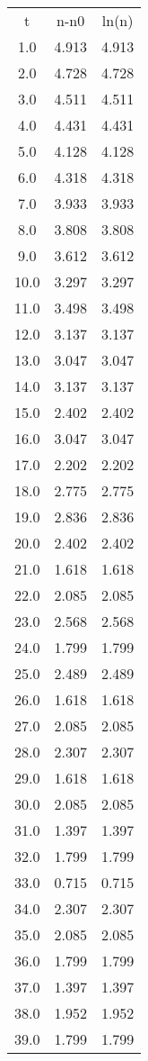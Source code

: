 \begin{table}
\begin{tabular}{ccc}
t & n-n0 & ln(n) \\
1.0 & 4.913 & 4.913 \\
2.0 & 4.728 & 4.728 \\
3.0 & 4.511 & 4.511 \\
4.0 & 4.431 & 4.431 \\
5.0 & 4.128 & 4.128 \\
6.0 & 4.318 & 4.318 \\
7.0 & 3.933 & 3.933 \\
8.0 & 3.808 & 3.808 \\
9.0 & 3.612 & 3.612 \\
10.0 & 3.297 & 3.297 \\
11.0 & 3.498 & 3.498 \\
12.0 & 3.137 & 3.137 \\
13.0 & 3.047 & 3.047 \\
14.0 & 3.137 & 3.137 \\
15.0 & 2.402 & 2.402 \\
16.0 & 3.047 & 3.047 \\
17.0 & 2.202 & 2.202 \\
18.0 & 2.775 & 2.775 \\
19.0 & 2.836 & 2.836 \\
20.0 & 2.402 & 2.402 \\
21.0 & 1.618 & 1.618 \\
22.0 & 2.085 & 2.085 \\
23.0 & 2.568 & 2.568 \\
24.0 & 1.799 & 1.799 \\
25.0 & 2.489 & 2.489 \\
26.0 & 1.618 & 1.618 \\
27.0 & 2.085 & 2.085 \\
28.0 & 2.307 & 2.307 \\
29.0 & 1.618 & 1.618 \\
30.0 & 2.085 & 2.085 \\
31.0 & 1.397 & 1.397 \\
32.0 & 1.799 & 1.799 \\
33.0 & 0.715 & 0.715 \\
34.0 & 2.307 & 2.307 \\
35.0 & 2.085 & 2.085 \\
36.0 & 1.799 & 1.799 \\
37.0 & 1.397 & 1.397 \\
38.0 & 1.952 & 1.952 \\
39.0 & 1.799 & 1.799 \\

\end{tabular}
\end{table}
